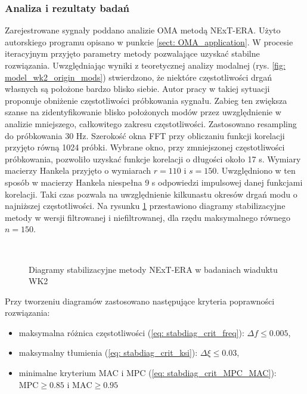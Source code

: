 \subsubsection{Analiza i rezultaty badań}
Zarejestrowane sygnały poddano analizie OMA metodą NExT-ERA. Użyto autorskiego programu opisano w punkcie \ref{sect: OMA_application}. W procesie iteracyjnym przyjęto parametry metody pozwalające uzyskać stabilne rozwiązania. Uwzględniając wyniki z teoretycznej analizy modalnej (rys. \ref{fig: model_wk2_origin_mods}) stwierdzono, że niektóre częstotliwości drgań własnych są położone bardzo blisko siebie. Autor pracy \cite{Caicedo2011} w takiej sytuacji proponuje obniżenie częstotliwości próbkowania sygnału. Zabieg ten zwiększa szanse na zidentyfikowanie blisko położonych modów przez uwzględnienie w analizie mniejszego, całkowitego zakresu częstotliwości. Zastosowano resampling do próbkowania 30 Hz. Szerokość okna FFT przy obliczaniu funkcji korelacji przyjęto równą 1024 próbki. Wybrane okno, przy zmniejszonej częstotliwości próbkowania, pozwoliło uzyskać funkcje korelacji o długości około 17 s. Wymiary macierzy Hankela przyjęto o wymiarach $r=110$ i $s=150$. Uwzględniono w ten sposób w macierzy Hankela niespełna 9 s odpowiedzi impulsowej danej funkcjami korelacji. Taki czas pozwala na uwzględnienie kilkunastu okresów drgań modu o najniższej częstotliwości. Na rysunku \ref{fig: wk2_research_stabdiags} przestawiono diagramy stabilizacyjne metody w wersji filtrowanej i niefiltrowanej, dla rzędu maksymalnego równego $n=150$.

\begin{figure}[hbt!]
	\centering
	\\
	\captionsetup{justification=centering}
	\caption{Diagramy stabilizacyjne metody NExT-ERA w badaniach wiaduktu WK2}
	\label{fig: wk2_research_stabdiags}
\end{figure}
Przy tworzeniu diagramów zastosowano następujące kryteria poprawności rozwiązania:
\begin{itemize}
	\item maksymalna różnica częstotliwości (\ref{eq: stabdiag_crit_freq}): $\Delta f \le 0.005$,
	\item maksymalny tłumienia (\ref{eq: stabdiag_crit_ksi}): $\Delta \xi \le 0.03$,
	\item minimalne kryterium MAC i MPC (\ref{eq: stabdiag_crit_MPC_MAC}): $\text{MPC}\ge 0.85$ i  $\text{MAC}\ge 0.95$
\end{itemize}

